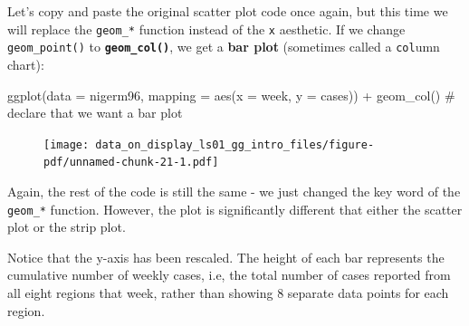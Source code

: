 \documentclass[
  letterpaper,
  DIV=11,
  numbers=noendperiod]{scrreprt}
\newenvironment{Shaded}{\begin{snugshade}}{\end{snugshade}}
\newcommand{\AttributeTok}[1]{\textcolor[rgb]{0.40,0.45,0.13}{#1}}
\newcommand{\CommentTok}[1]{\textcolor[rgb]{0.37,0.37,0.37}{#1}}
\newcommand{\FunctionTok}[1]{\textcolor[rgb]{0.28,0.35,0.67}{#1}}
\newcommand{\NormalTok}[1]{\textcolor[rgb]{0.00,0.23,0.31}{#1}}
\newcommand{\SpecialCharTok}[1]{\textcolor[rgb]{0.37,0.37,0.37}{#1}}
\begin{document}
Let's copy and paste the original scatter plot code once again, but this
time we will replace the \texttt{geom\_*} function instead of the
\texttt{x} aesthetic. If we change \texttt{geom\_point()} to
\textbf{\texttt{geom\_col()}}, we get a \textbf{bar plot} (sometimes
called a \texttt{col}umn chart):

\begin{Shaded}
\begin{Highlighting}[]
\FunctionTok{ggplot}\NormalTok{(}\AttributeTok{data =}\NormalTok{ nigerm96, }
       \AttributeTok{mapping =} \FunctionTok{aes}\NormalTok{(}\AttributeTok{x =}\NormalTok{ week,}
                     \AttributeTok{y =}\NormalTok{ cases)) }\SpecialCharTok{+}  
  \FunctionTok{geom\_col}\NormalTok{()  }\CommentTok{\# declare that we want a bar plot}
\end{Highlighting}
\end{Shaded}

\begin{figure}[H]

{\centering \texttt{[image: data\_on\_display\_ls01\_gg\_intro\_files/figure-pdf/unnamed-chunk-21-1.pdf]}

}

\end{figure}

Again, the rest of the code is still the same - we just changed the key
word of the \texttt{geom\_*} function. However, the plot is
significantly different that either the scatter plot or the strip plot.

Notice that the y-axis has been rescaled. The height of each bar
represents the cumulative number of weekly cases, i.e, the total number
of cases reported from all eight regions that week, rather than showing
8 separate data points for each region.
\end{document}
